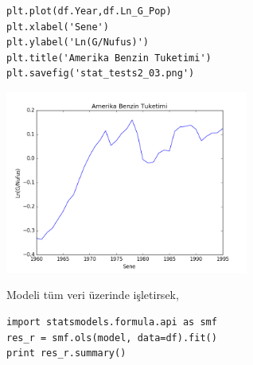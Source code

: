 \documentclass[12pt,fleqn]{article}\usepackage{../../common}
\begin{document}
\begin{verbatim}
plt.plot(df.Year,df.Ln_G_Pop)
plt.xlabel('Sene')
plt.ylabel('Ln(G/Nufus)')
plt.title('Amerika Benzin Tuketimi')
plt.savefig('stat_tests2_03.png')
\end{verbatim}

\includegraphics[height=6cm]{stat_tests2_03.png}

Modeli tüm veri üzerinde işletirsek,

\begin{verbatim}
import statsmodels.formula.api as smf
res_r = smf.ols(model, data=df).fit()
print res_r.summary()
\end{verbatim}
\end{document}
